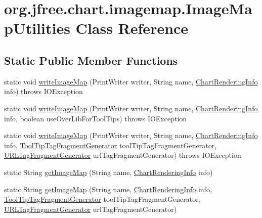 \hypertarget{classorg_1_1jfree_1_1chart_1_1imagemap_1_1_image_map_utilities}{}\section{org.\+jfree.\+chart.\+imagemap.\+Image\+Map\+Utilities Class Reference}
\label{classorg_1_1jfree_1_1chart_1_1imagemap_1_1_image_map_utilities}
\subsection*{Static Public Member Functions}
\begin{DoxyCompactItemize}
\item 
static void \mbox{\hyperlink{classorg_1_1jfree_1_1chart_1_1imagemap_1_1_image_map_utilities_a490345f58ad0c3f9284eeff1437c0d91}{write\+Image\+Map}} (Print\+Writer writer, String name, \mbox{\hyperlink{classorg_1_1jfree_1_1chart_1_1_chart_rendering_info}{Chart\+Rendering\+Info}} info)  throws I\+O\+Exception 
\item 
static void \mbox{\hyperlink{classorg_1_1jfree_1_1chart_1_1imagemap_1_1_image_map_utilities_a63fd3b3723be096b13bcd7c4252bb678}{write\+Image\+Map}} (Print\+Writer writer, String name, \mbox{\hyperlink{classorg_1_1jfree_1_1chart_1_1_chart_rendering_info}{Chart\+Rendering\+Info}} info, boolean use\+Over\+Lib\+For\+Tool\+Tips)  throws I\+O\+Exception 
\item 
static void \mbox{\hyperlink{classorg_1_1jfree_1_1chart_1_1imagemap_1_1_image_map_utilities_abefcbc5977f784e88a59299646b83bd2}{write\+Image\+Map}} (Print\+Writer writer, String name, \mbox{\hyperlink{classorg_1_1jfree_1_1chart_1_1_chart_rendering_info}{Chart\+Rendering\+Info}} info, \mbox{\hyperlink{interfaceorg_1_1jfree_1_1chart_1_1imagemap_1_1_tool_tip_tag_fragment_generator}{Tool\+Tip\+Tag\+Fragment\+Generator}} tool\+Tip\+Tag\+Fragment\+Generator, \mbox{\hyperlink{interfaceorg_1_1jfree_1_1chart_1_1imagemap_1_1_u_r_l_tag_fragment_generator}{U\+R\+L\+Tag\+Fragment\+Generator}} url\+Tag\+Fragment\+Generator)  throws I\+O\+Exception 
\item 
static String \mbox{\hyperlink{classorg_1_1jfree_1_1chart_1_1imagemap_1_1_image_map_utilities_a7e478173f67d5bd55aee18f2e14d03c4}{get\+Image\+Map}} (String name, \mbox{\hyperlink{classorg_1_1jfree_1_1chart_1_1_chart_rendering_info}{Chart\+Rendering\+Info}} info)
\item 
static String \mbox{\hyperlink{classorg_1_1jfree_1_1chart_1_1imagemap_1_1_image_map_utilities_a2adddae3d31eafb319b6e3ab6d2d43a4}{get\+Image\+Map}} (String name, \mbox{\hyperlink{classorg_1_1jfree_1_1chart_1_1_chart_rendering_info}{Chart\+Rendering\+Info}} info, \mbox{\hyperlink{interfaceorg_1_1jfree_1_1chart_1_1imagemap_1_1_tool_tip_tag_fragment_generator}{Tool\+Tip\+Tag\+Fragment\+Generator}} tool\+Tip\+Tag\+Fragment\+Generator, \mbox{\hyperlink{interfaceorg_1_1jfree_1_1chart_1_1imagemap_1_1_u_r_l_tag_fragment_generator}{U\+R\+L\+Tag\+Fragment\+Generator}} url\+Tag\+Fragment\+Generator)

\end{DoxyCompactItemize}
